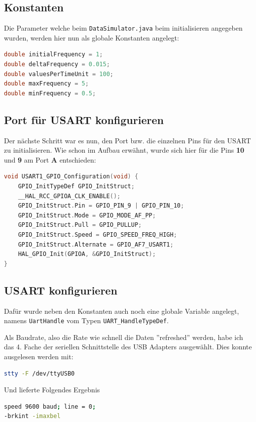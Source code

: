 \subsection{Konstanten}
Die Parameter welche beim \verb|DataSimulator.java| beim initialisieren angegeben wurden, werden hier nun als globale Konstanten angelegt:

\begin{lstlisting}[language=C]
double initialFrequency = 1;
double deltaFrequency = 0.015;
double valuesPerTimeUnit = 100;
double maxFrequency = 5;
double minFrequency = 0.5;
\end{lstlisting}

\subsection{Port für USART konfigurieren}
Der nächste Schritt war es nun, den Port bzw. die einzelnen Pins für den USART zu initialisieren. Wie schon im Aufbau erwähnt, wurde sich hier für die Pins \textbf{10} und \textbf{9} am Port \textbf{A} entschieden:

\begin{lstlisting}[language=C]
void USART1_GPIO_Configuration(void) {
	GPIO_InitTypeDef GPIO_InitStruct;
	__HAL_RCC_GPIOA_CLK_ENABLE();
	GPIO_InitStruct.Pin = GPIO_PIN_9 | GPIO_PIN_10;
	GPIO_InitStruct.Mode = GPIO_MODE_AF_PP;
	GPIO_InitStruct.Pull = GPIO_PULLUP;
	GPIO_InitStruct.Speed = GPIO_SPEED_FREQ_HIGH;
	GPIO_InitStruct.Alternate = GPIO_AF7_USART1;
	HAL_GPIO_Init(GPIOA, &GPIO_InitStruct);
}
\end{lstlisting}

\subsection{USART konfigurieren}
Dafür wurde neben den Konstanten auch noch eine globale Variable angelegt, namens \verb|UartHandle| vom Typen \verb|UART_HandleTypeDef|.

Als Baudrate, also die Rate wie schnell die Daten ''refreshed'' werden, habe ich das 4. Fache der seriellen Schnittstelle des USB Adapters ausgewählt. Dies konnte ausgelesen werden mit:

\begin{lstlisting}[language=bash]
stty -F /dev/ttyUSB0
\end{lstlisting}

Und lieferte Folgendes Ergebnis

\begin{lstlisting}[language=bash]
speed 9600 baud; line = 0;
-brkint -imaxbel
\end{lstlisting}

